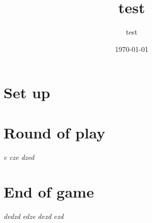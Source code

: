 \documentclass{article}%
\title{test}%
\author{test}%
\date{\today}%
\begin{document}
%
\pagestyle{empty}%
\normalsize%
\maketitle%
\section{ Set up
}%
\label{sec:Setup}%

%
\section{ Round of play
}%
\label{sec:Roundofplay}%
\textit{ e
}%
\textit{ cze
}%
\textit{ dzed
}

%
\section{ End of game
}%
\label{sec:Endofgame}%
\textit{ dedzd
}%
\textit{ edze
}%
\textit{ dezd
}%
\textit{ ezd}

%
\end{document}
